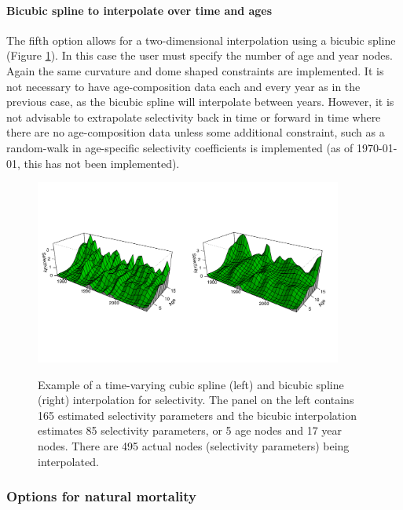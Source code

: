 \paragraph{Bicubic spline to interpolate over time and ages}  The fifth option allows for a two-dimensional interpolation using a bicubic spline (Figure \ref{Fig3}).  In this case the user must specify the number of age and year nodes.  Again the same curvature and dome shaped constraints are implemented.  It is not necessary to have age-composition data each and every year as in the previous case, as the bicubic spline will interpolate between years.  However, it is not advisable to extrapolate selectivity back in time or forward in time where there are no age-composition data unless some additional constraint, such as a random-walk in age-specific selectivity coefficients is implemented (as of \today, this has not been implemented).

\begin{figure}[!tbp]
	\centering
	\includegraphics[width=0.9\textwidth]{../Figs/BicubicEg.pdf}\\
	\caption{Example of a time-varying cubic spline (left) and bicubic spline (right) interpolation for selectivity. The panel on the left contains 165 estimated selectivity parameters and the bicubic interpolation estimates 85 selectivity parameters, or 5 age nodes and 17 year nodes. There are 495 actual nodes (selectivity parameters) being interpolated.}\label{Fig3}
\end{figure}






		\subsubsection{Options for natural mortality}
		
